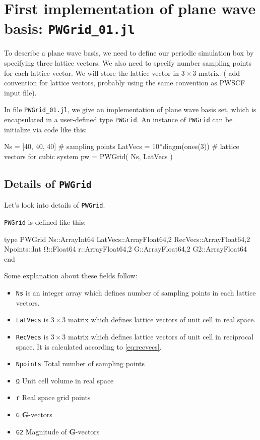 \section{First implementation of plane wave basis: {\tt PWGrid\_01.jl}}

To describe a plane wave basis, we need to define our periodic simulation box
by specifying three lattice vectors. We also need to specify number sampling
points for each lattice vector.
We will store the lattice vector in $3\times3$ matrix.
({\color{red} add convention for lattice vectors, probably using
the same convention as PWSCF input file}).

In file {\tt PWGrid\_01.jl}, we give an implementation of plane wave basis
set, which is encapsulated in a user-defined type {\tt PWGrid}.
An instance of {\tt PWGrid} can be initialize via code like this:

\begin{juliacode}
Ns = [40, 40, 40]  # sampling points
LatVecs = 10*diagm(ones(3))  # lattice vectors for cubic system
pw = PWGrid( Ns, LatVecs )
\end{juliacode}

\subsection{Details of {\tt PWGrid}}

Let's look into details of {\tt PWGrid}.

\verb|PWGrid| is defined like this:

\begin{juliacode}
type PWGrid
  Ns::Array{Int64}
  LatVecs::Array{Float64,2}
  RecVecs::Array{Float64,2}
  Npoints::Int
  Ω::Float64
  r::Array{Float64,2}
  G::Array{Float64,2}
  G2::Array{Float64}
end
\end{juliacode}

Some explanation about these fields follow:

\begin{itemize}

\item {\tt Ns} is an integer array which defines number of sampling points
in each lattice vectors.

\item {\tt LatVecs} is $3\times3$ matrix which defines lattice vectors of
unit cell in real space.

\item {\tt RecVecs} is $3\times3$ matrix which defines lattice vectors of
unit cell in reciprocal space. It is calculated according to \eqref{eq:recvecs}.

\item {\tt Npoints} Total number of sampling points
\item {\tt Ω} Unit cell volume in real space
\item {\tt r} Real space grid points
\item {\tt G} \textbf{G}-vectors
\item {\tt G2} Magnitude of \textbf{G}-vectors

\end{itemize}

